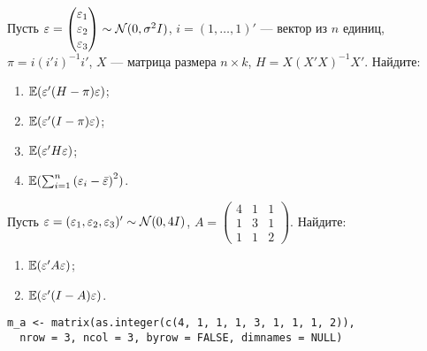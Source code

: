 \begin{problem}
Пусть $\varepsilon = \begin{pmatrix} \varepsilon_1 \\ \varepsilon_2 \\ \varepsilon_3 \end{pmatrix} \sim \mathcal{N}(0,\sigma^2 I)$, $i = (1,\dots,1)'$ — вектор из $n$ единиц, $\pi=i(i'i)^{-1}i'$,
$X$ — матрица размера ${n \times k}$, $H = X(X'X)^{-1}X'$. Найдите:
\begin{enumerate}
\item $\mathbb{E}(\varepsilon'(H - \pi)\varepsilon)$;
\item $\mathbb{E}(\varepsilon'(I - \pi)\varepsilon)$;
\item $\mathbb{E}(\varepsilon'H\varepsilon)$;
\item $\mathbb{E}(\sum_{i=1}^n {(\varepsilon_i - \bar{\varepsilon})}^2)$.
\end{enumerate}


\begin{sol}
\end{sol}
\end{problem}


\begin{problem}
Пусть $\varepsilon = (\varepsilon_1, \varepsilon_2, \varepsilon_3)'\sim \mathcal{N}(0, 4I)$, $A = \begin{pmatrix} 4 & 1 & 1 \\ 1 & 3 & 1 \\ 1 & 1 & 2 \end{pmatrix}$. Найдите:

\begin{enumerate}
\item $\mathbb{E}(\varepsilon'A\varepsilon)$;
\item $\mathbb{E}(\varepsilon'(I - A)\varepsilon)$.
\end{enumerate}


\begin{sol}
\begin{verbatim}
m_a <- matrix(as.integer(c(4, 1, 1, 1, 3, 1, 1, 1, 2)),
  nrow = 3, ncol = 3, byrow = FALSE, dimnames = NULL)
\end{verbatim}

\end{sol}
\end{problem}



